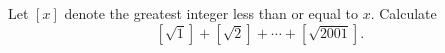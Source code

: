 \documentclass[varwidth]{standalone}
\begin{document}
    Let $[x]$ denote the greatest integer less than or equal to $x$. Calculate
    \[
        \left[\sqrt{1}\right] + \left[\sqrt{2}\right] + \cdots + \left[\sqrt{2001}\right].  
    \]
\end{document}
